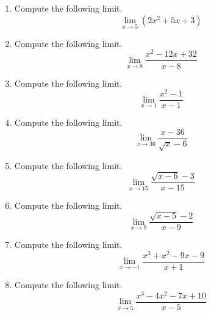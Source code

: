 \documentclass{article}
\begin{document}
\ActivityTitle[class=Calculus I, number=1, name=Limits]

\begin{enumerate}
\item Compute the following limit. \[ \lim_{x \rightarrow 5} \left( 2 x^2 + 5 x + 3 \right) \]



  
\vspace{5cm}

\item Compute the following limit. \[ \displaystyle\lim_{x \rightarrow 8} \frac{x^2 - 12x + 32}{x - 8} \]



  
\vspace{5cm}

\item Compute the following limit. \[ \lim_{x \rightarrow 1} \frac{x^2 - 1}{x - 1} \]



  
\vspace{5cm}

\item Compute the following limit. \[ \lim_{x \rightarrow 36} \frac{x - 36}{\sqrt{x} - 6} \]



  
\vspace{5cm}

\item Compute the following limit. \[ \lim_{x \rightarrow 15} \frac{\sqrt{x - 6} - 3}{x - 15} \]



  
\vspace{5cm}

\item Compute the following limit. \[ \lim_{x \rightarrow 9} \frac{\sqrt{x - 5} - 2}{x - 9} \]



  
\vspace{5cm}

\item Compute the following limit. \[ \lim_{x \rightarrow -1} \frac{x^3 + x^2 - 9x - 9}{x + 1} \]



  
\vspace{5cm}

\item Compute the following limit. \[ \lim_{x \rightarrow 5} \frac{x^3 - 4x^2 - 7x + 10}{x - 5} \]



  
\vspace{5cm}
\end{enumerate}
\end{document}
